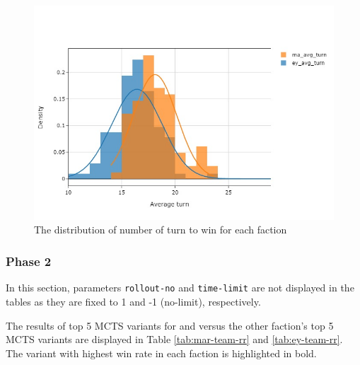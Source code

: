\begin{figure}[h!]
    \begin{center}
      \includegraphics[width=\textwidth]{./images/fig-stage-1-avg-turn-dist.jpeg}
    \end{center}
    \caption{The distribution of number of turn to win for each faction}
    \label{fig:stage-1-avg-turn-dist}
\end{figure}


\subsubsection{Phase 2}


In this section, parameters \texttt{rollout-no} and \texttt{time-limit} are not displayed in the tables as they are fixed to 1 and -1 (no-limit), respectively.

The results of top 5 MCTS variants for \Marquise{} and \Eyrie{} versus the other faction's top 5 MCTS variants are displayed in Table \ref{tab:mar-team-rr} and \ref{tab:ey-team-rr}. The variant with highest win rate in each faction is highlighted in bold.

